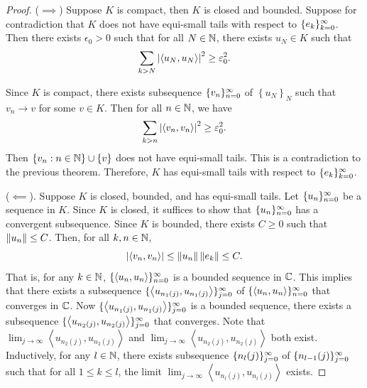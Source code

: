 \documentclass[a4paper]{article}
\renewcommand{\braket}[2]{\left\langle #1, #1 \right\rangle}
\begin{document}
\begin{proof}
($\implies$) Suppose $K$ is compact, then $K$ is closed and 
bounded. Suppose for contradiction that $K$ does not have 
equi-small tails with respect to $\{ e_k \}_{k=0}^\infty$. Then 
there exists $\epsilon_0 > 0$ such that for all 
$N \in \mathbb{N}$, there exists $u_N \in K$ such that 
\[
\sum_{k > N} \abs{\braket{u_N}{e_k}}^2 \geq \epsilon_0^2.
\]

Since $K$ is compact, there exists subsequence $\{ v_n \}_{n=0}^\infty$
of $\left\{ u_N \right\}_N$ such that $v_n \to v$ for some 
$v \in K$. Then for all $n \in \mathbb{N}$, we have 
\[
\sum_{k > n} \abs{\braket{v_n}{e_k}}^2 \geq \epsilon_0^2.
\]
Then $\left\{ v_n : n \in \mathbb{N} \right\} \cup \left\{ v \right\}$ 
does not have equi-small tails. This is a contradiction to the previous 
theorem. Therefore, $K$ has equi-small tails with respect 
to $\{ e_k \}_{k=0}^\infty$.

($\impliedby$). Suppose $K$ is closed, bounded, and has equi-small
tails. Let $\{ u_n \}_{n=0}^\infty$ be a sequence in $K$. Since $K$ 
is closed, it suffices to show that $\{ u_n \}_{n=0}^\infty$ has a 
convergent subsequence. Since $K$ is bounded, 
there exists $C \geq 0$ such that $\left\lVert u_n\right\rVert \leq C$. 
Then, for all $k, n \in \mathbb{N}$, 
\[
  \abs{\braket{v_n}{e_k}} \leq \norm{u_n} \norm{e_k} \leq C.
\]
That is, for any $k \in \mathbb{N}$, $\seqinfn{\braket{u_n}{e_k}}$ 
is a bounded sequence in $\mathbb{C}$. This implies that 
there exists a subsequence $\seqinfj{\braket{u_{n_1(j)}}{e_1}}$ 
of $\seqinfn{\braket{u_n}{e_1}}$ that converges in $\mathbb{C}$. 
Now $\seqinfj{\braket{u_{n_1(j)}}{e_2}}$ is a bounded sequence, 
there exists a subsequence $\seqinfj{\braket{u_{n_2(j)}}{e_2}}$
that converges. Note that 
$\lim_{j \to \infty} \braket{u_{n_2(j)}}{e_1}$ 
and $\lim_{j \to \infty} \braket{u_{n_2(j)}}{e_2}$ 
both exist. Inductively, for any $l \in \mathbb{N}$, there 
exists subsequence $\{ n_l(j) \}_{j=0}^\infty$ of $\{ n_{l-1}(j) \}_{j=0}^\infty$
such that for all $1 \leq k \leq l$, the limit
$\lim_{j \to \infty} \braket{u_{n_l(j)}}{e_k}$ exists.


\end{proof}
\end{document}
